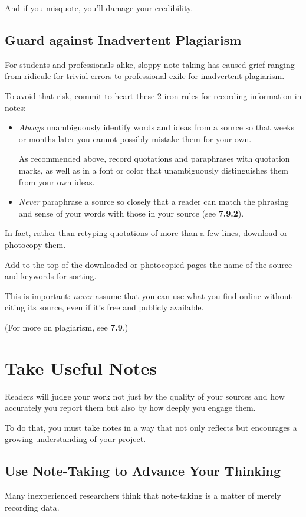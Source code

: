 \documentclass[oneside]{book}
\numberwithin{equation}{section}
\begin{document}
And if you misquote, you'll damage your credibility.

\subsection{Guard against Inadvertent Plagiarism}
For students and professionals alike, sloppy note-taking has caused grief ranging from ridicule for trivial errors to professional exile for inadvertent plagiarism.

To avoid that risk, commit to heart these 2 iron rules for recording information in notes:
\begin{itemize}
    \item \textit{Always} unambiguously identify words and ideas from a source so that weeks or months later you cannot possibly mistake them for your own.
    
    As recommended above, record quotations and paraphrases with quotation marks, as well as in a font or color that unambiguously distinguishes them from your own ideas.
    \item \textit{Never} paraphrase a source so closely that a reader can match the phrasing and sense of your words with those in your source (see \textbf{7.9.2}).
\end{itemize}
In fact, rather than retyping quotations of more than a few lines, download or photocopy them.

Add to the top of the downloaded or photocopied pages the name of the source and keywords for sorting.

%
This is important: \textit{never} assume that you can use what you find online without citing its source, even if it's free and publicly available.


(For more on
plagiarism, see \textbf{7.9}.)

\section{Take Useful Notes}
Readers will judge your work not just by the quality of your sources and how accurately you report them but also by how deeply you engage them.

To do that, you must take notes in a way that not only reflects but encourages a growing understanding of your project.

\subsection{Use Note-Taking to Advance Your Thinking}
Many inexperienced researchers think that note-taking is a matter of merely recording data.
\end{document}
